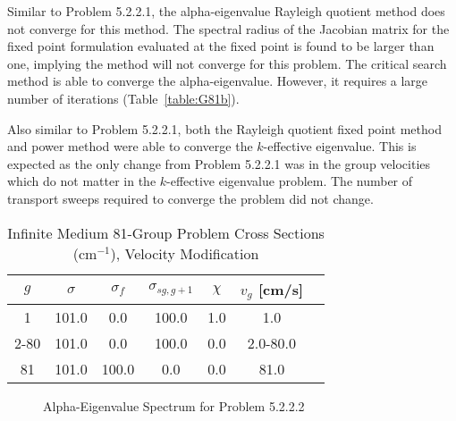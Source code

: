 Similar to Problem 5.2.2.1, the alpha-eigenvalue Rayleigh quotient method does not converge for this method. The spectral radius of the Jacobian matrix for the fixed point formulation evaluated at the fixed point is found to be larger than one, implying the method will not converge for this problem. The critical search method is able to converge the alpha-eigenvalue. However, it requires a large number of iterations (Table~\ref{table:G81b}).

Also similar to Problem 5.2.2.1, both the Rayleigh quotient fixed point method and power method were able to converge the $k$-effective eigenvalue. This is expected as the only change from Problem 5.2.2.1 was in the group velocities which do not matter in the $k$-effective eigenvalue problem. The number of transport sweeps required to converge the problem did not change.

\begin{table}[!htbp]
    \centering
    \caption{Infinite Medium 81-Group Problem Cross Sections (cm$^{-1}$), Velocity Modification}
\label{table:G81v}
    \begin{tabular}{*7c}
        \toprule
	$g$ & $\sigma$ & $\sigma_{f}$ & $\sigma_{sg,g+1}$ & $\chi$ & $v_{g}$ [cm/s] \\ 
        \midrule
	1 & 101.0 & 0.0 & 100.0 & 1.0 & 1.0 \\
	2-80 & 101.0 & 0.0 & 100.0 & 0.0 & 2.0-80.0 \\
	81 & 101.0 & 100.0 & 0.0 & 0.0 & 81.0 \\
        \bottomrule
    \end{tabular}
\end{table}

\begin{figure}[!htbp]
\centering
	\resizebox{0.75\textwidth}{!}{
	}
\caption{Alpha-Eigenvalue Spectrum for Problem 5.2.2.2}
\label{fig:G81VSpec}
\end{figure}

\begin{table}[!htbp]
    \centering
    \caption{Transport Sweeps for Convergence for Problem 5.2.2.2}
\label{table:G81b}
\end{table}

